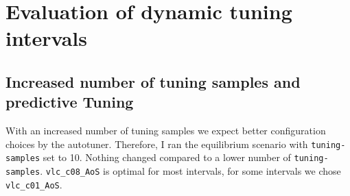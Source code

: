 \documentclass[]{article}
\begin{document}
%

\section{Evaluation of dynamic tuning intervals}


\subsection{Increased number of tuning samples and predictive Tuning}
With an increased number of tuning samples we expect better configuration choices by the autotuner. Therefore, I ran the equilibrium scenario with \texttt{tuning-samples} set to 10. Nothing changed compared to a lower number of \texttt{tuning-samples}. \texttt{vlc\_c08\_AoS} is optimal for most intervals, for some intervals we chose \texttt{vlc\_c01\_AoS}.
\end{document}
